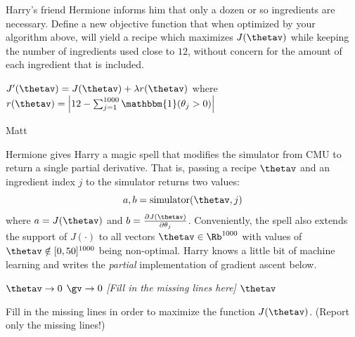 \begin{questions}
\question[3] Harry's friend Hermione informs him that only a dozen or so ingredients are necessary. Define a new objective function that when optimized by your algorithm above, will yield a recipe which maximizes $J(\thetav)$ while keeping the number of ingredients used close to $12$, without concern for the amount of each ingredient that is included.
    \begin{tcolorbox}[fit,height=1cm, width=15cm, blank, borderline={1pt}{-2pt}]
    \end{tcolorbox}
    \begin{soln}
    $J'(\thetav) = J(\thetav) + \lambda r(\thetav)$ where $r(\thetav) = \left| 12 - \sum_{j = 1}^{1000} \mathbbm{1}(\theta_j > 0) \right|$ 
    \end{soln}
    \begin{qauthor}
    Matt
    \end{qauthor}
    
\question[3] Hermione gives Harry a magic spell that modifies the simulator from CMU to return a single partial derivative. That is, passing a recipe $\thetav$ and an ingredient index $j$ to the simulator returns two values:
$$a, b = \text{simulator}(\thetav, j)$$
where $a = J(\thetav)$ and $b = \frac{\partial J(\thetav)}{\partial \theta_j}$. Conveniently, the spell also extends the support of $J(\cdot)$ to all vectors $\thetav \in \Rb^{1000}$ with values of $\thetav \notin [0, 50]^{1000}$ being non-optimal. Harry knows a little bit of machine learning and writes the \emph{partial} implementation of gradient ascent below.

    \begin{algorithmic}[1]
    \State $\thetav \rightarrow 0$  
        \State $\gv \rightarrow 0$ 
        \State \emph{[Fill in the missing lines here]}
         
            \State {}
        \EndIf
    \EndWhile
    \Return $\thetav$ 
    \EndProcedure
    \end{algorithmic}

Fill in the missing lines in order to maximize the function $J(\thetav)$. (Report only the missing lines!)


\end{questions}
